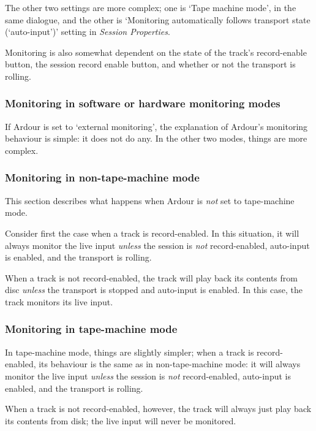 \documentclass[10pt,a4paper]{book}
\begin{document}
{The other two settings are more complex; one is `Tape machine mode',
in the same dialogue, and the other is `Monitoring automatically
follows transport state (`auto-input')' setting in \emph{Session
  Properties}.

Monitoring is also somewhat dependent on the state of the track's
record-enable button, the session record enable button, and whether or
not the transport is rolling.


\subsubsection{Monitoring in software or hardware monitoring modes}

If Ardour is set to `external monitoring', the explanation of Ardour's
monitoring behaviour is simple: it does not do any.  In the other two
modes, things are more complex.


\subsubsection{Monitoring in non-tape-machine mode}

This section describes what happens when Ardour is \emph{not} set to
tape-machine mode.

Consider first the case when a track is record-enabled.  In this
situation, it will always monitor the live input \emph{unless} the
session is \emph{not} record-enabled, auto-input is enabled, and the
transport is rolling.  

When a track is not record-enabled, the track will play back its
contents from disc \emph{unless} the transport is stopped and
auto-input is enabled.  In this case, the track monitors its live
input.


\subsubsection{Monitoring in tape-machine mode}

In tape-machine mode, things are slightly simpler; when a track is
record-enabled, its behaviour is the same as in non-tape-machine mode:
it will always monitor the live input \emph{unless} the session is
\emph{not} record-enabled, auto-input is enabled, and the transport is
rolling.

When a track is not record-enabled, however, the track will always
just play back its contents from disk; the live input will never be
monitored.


}
\end{document}
